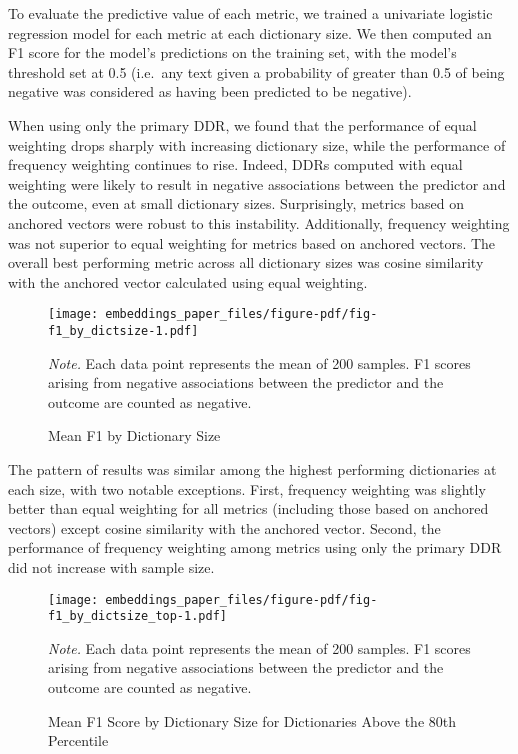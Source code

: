 \documentclass[
  man,
  floatsintext,
  longtable,
  nolmodern,
  notxfonts,
  notimes,
  colorlinks=true,linkcolor=blue,citecolor=blue,urlcolor=blue]{apa7}
\begin{document}
To evaluate the predictive value of each metric, we trained a univariate
logistic regression model for each metric at each dictionary size. We
then computed an F1 score for the model's predictions on the training
set, with the model's threshold set at 0.5 (i.e.~any text given a
probability of greater than 0.5 of being negative was considered as
having been predicted to be negative).

When using only the primary DDR, we found that the performance of equal
weighting drops sharply with increasing dictionary size, while the
performance of frequency weighting continues to rise. Indeed, DDRs
computed with equal weighting were likely to result in negative
associations between the predictor and the outcome, even at small
dictionary sizes. Surprisingly, metrics based on anchored vectors were
robust to this instability. Additionally, frequency weighting was not
superior to equal weighting for metrics based on anchored vectors. The
overall best performing metric across all dictionary sizes was cosine
similarity with the anchored vector calculated using equal weighting.

\begin{figure}

{\caption{{Mean F1 by Dictionary Size}{\label{fig-f1\_by\_dictsize}}}}

\texttt{[image: embeddings\_paper\_files/figure-pdf/fig-f1\_by\_dictsize-1.pdf]}

{\noindent \emph{Note.} Each data point represents the mean of 200
samples. F1 scores arising from negative associations between the
predictor and the outcome are counted as negative.}

\end{figure}

The pattern of results was similar among the highest performing
dictionaries at each size, with two notable exceptions. First, frequency
weighting was slightly better than equal weighting for all metrics
(including those based on anchored vectors) except cosine similarity
with the anchored vector. Second, the performance of frequency weighting
among metrics using only the primary DDR did not increase with sample
size.

\begin{figure}

{\caption{{Mean F1 Score by Dictionary Size for Dictionaries Above the
80th Percentile}{\label{fig-f1\_by\_dictsize\_top}}}}

\texttt{[image: embeddings\_paper\_files/figure-pdf/fig-f1\_by\_dictsize\_top-1.pdf]}

{\noindent \emph{Note.} Each data point represents the mean of 200
samples. F1 scores arising from negative associations between the
predictor and the outcome are counted as negative.}

\end{figure}
\end{document}
